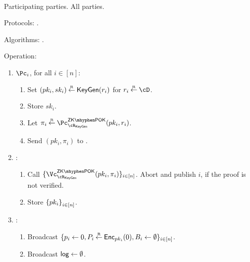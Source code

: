 \begin{protocol}~\label{prot:ConfidentialTransactions:Init}
	

	\item[Participating parties.] All parties.
			
			
	\item[Protocols:]   \piZKPOK{\rKeyGen}. 
	
	
	\item[Algorithms:]    \KeyGen.
	
			
			\item[Operation:]~
			
			
			\begin{enumerate}
				
				\item   $\Pc_i$, for  all $i\in [n]$:
				\begin{enumerate}
					\item Set $(pk_i,sk_i) \mathbin{\stackrel{\mbox{\tiny R}}{\leftarrow}} \mathsf{KeyGen}(r_i)$ for $r_i \getsr \cD$.
					
					\item Store $sk_i$.
					
					\item Let $\pi_i \getsr \pZKPOK{\rKeyGen}(pk_i,r_i)$.
					
					\item Send $(pk_i,\pi_i)$ to \Cc.
					
					
				\end{enumerate}
				
				\item \Cc:
				\begin{enumerate}
					
					\item Call $\sset{ \vZKPOK{\rKeyGen}(pk_i,\pi_i)}_{i\in [n]}$. Abort and publish $i$, if the \ith  proof is not verified. 
										
					\item Store $\set{pk_i}_{i\in [n]}$.
				\end{enumerate}
				
				
				\item \Cc: 
				\begin{enumerate}
					\item 	Broadcast $\{p_i \leftarrow 0, P_i\mathbin{\stackrel{\mbox{\tiny R}}{\leftarrow}} \mathsf{Enc}_{pk_i}(0),B_i\leftarrow \emptyset\}_{i\in [n]}$.
					
					\item    Broadcast $\mathsf{log} \leftarrow \emptyset$.
				\end{enumerate}								
			\end{enumerate}
\end{protocol}


